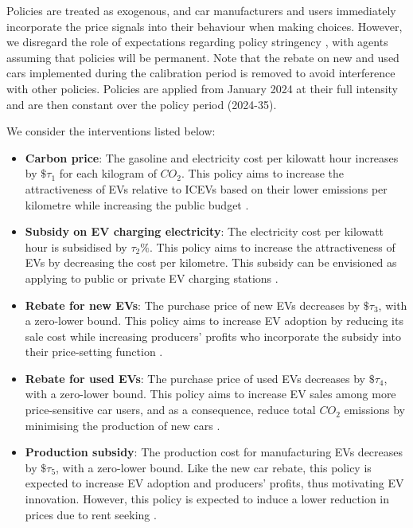 \documentclass[12pt]{article}
\begin{document}
	Policies are treated as exogenous, and car manufacturers and users immediately incorporate the price signals into their behaviour when making choices. However, we disregard the role of expectations regarding policy stringency \citep{helm2003credible,aghion2019path}, with agents assuming that policies will be permanent. Note that the rebate on new and used cars implemented during the calibration period is removed to avoid interference with other policies. Policies are applied from January 2024 at their full intensity and are then constant over the policy period (2024-35).
	
	We consider the interventions listed below:
	
	\begin{itemize}
		\item \textbf{Carbon price}: The gasoline and electricity cost per kilowatt hour increases by $\$\tau_1$ for each kilogram of $CO_2$. This policy aims to increase the attractiveness of EVs relative to ICEVs based on their lower emissions per kilometre while increasing the public budget \citep{Hardman2019Understanding}.
		\item \textbf{Subsidy on EV charging electricity}: The electricity cost per kilowatt hour is subsidised by $\tau_2\%$. This policy aims to increase the attractiveness of EVs by decreasing the cost per kilometre. This subsidy can be envisioned as applying to public or private EV charging stations \citep{Kwon2018Evaluation}. 
		\item \textbf{Rebate for new EVs}: The purchase price of new EVs decreases by $\$\tau_3$, with a zero-lower bound. This policy aims to increase EV adoption by reducing its sale cost while increasing producers' profits who incorporate the subsidy into their price-setting function \citep{Lodhia2024Assessment}. 
		\item \textbf{Rebate for used EVs}: The purchase price of used EVs decreases by $\$\tau_4$, with a zero-lower bound. This policy aims to increase EV sales among more price-sensitive car users, and as a consequence, reduce total $CO_2$ emissions by minimising the production of new cars \citep{Lodhia2024Assessment}. 
		\item \textbf{Production subsidy}: The production cost for manufacturing EVs decreases by $\$\tau_5$, with a zero-lower bound. Like the new car rebate, this policy is expected to increase EV adoption and producers' profits, thus motivating EV innovation. However, this policy is expected to induce a lower reduction in prices due to rent seeking \citep{OECD2025Subsidies}.
	\end{itemize}
\end{document}
